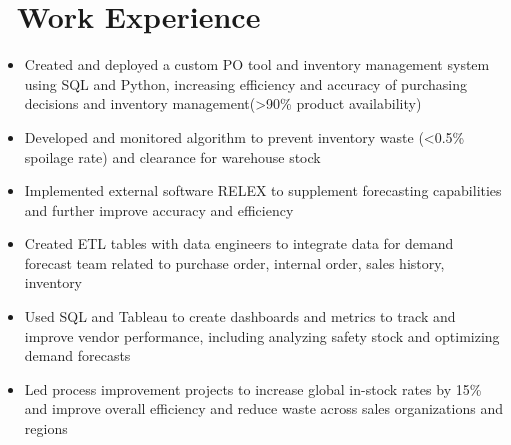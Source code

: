 \documentclass{resume}
\begin{document}
\section{
\texorpdfstring{\faUsers\ Work
Experience}
{-{}--Work Experience}}
\begin{itemize}
      \item Created and deployed a custom PO tool and inventory management
            system using SQL and Python, increasing efficiency and accuracy of
            purchasing decisions and inventory management(>90\% product
            availability)
      \item Developed and monitored algorithm to prevent inventory waste
            (<0.5\% spoilage rate) and clearance for warehouse stock
      \item Implemented external software RELEX to supplement forecasting
            capabilities and further improve accuracy and efficiency
      \item Created ETL tables with data engineers to integrate data for demand
            forecast team related to purchase order, internal order,
            sales history, inventory
      \item Used SQL and Tableau to create dashboards and metrics to track and
            improve vendor performance, including analyzing safety stock and
            optimizing demand forecasts
      \item Led process improvement projects to increase global in-stock rates
            by 15\% and improve overall efficiency and reduce waste across
            sales organizations and regions
\end{itemize}
\end{document}
